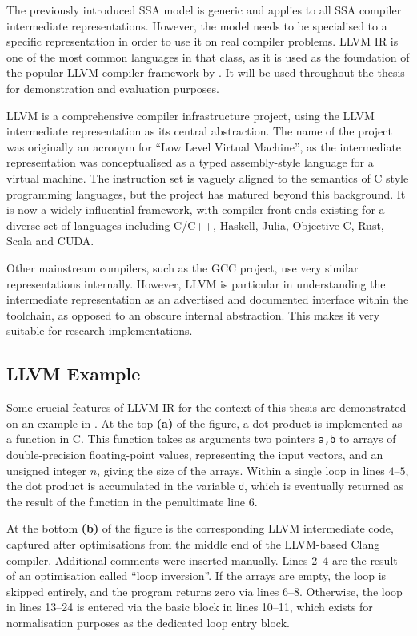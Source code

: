     The previously introduced SSA model is generic and applies to all SSA
    compiler intermediate representations.
    However, the model needs to be specialised to a specific representation in
    order to use it on real compiler problems.
    LLVM IR is one of the most common languages in that class, as it is
    used as the foundation of the popular LLVM compiler framework by
    \citet{lattner2004llvm}.
    It will be used throughout the thesis for demonstration and evaluation
    purposes.

    LLVM is a comprehensive compiler infrastructure project, using the LLVM
    intermediate representation as its central abstraction.
    The name of the project was originally an acronym for
    ``Low Level Virtual Machine'', as the intermediate representation was
    conceptualised as a typed assembly-style language for a virtual machine.
    The instruction set is vaguely aligned to the semantics of C style
    programming languages, but the project has matured beyond this background.
    It is now a widely influential framework, with compiler front ends existing
    for a diverse set of languages including C/C++, Haskell, Julia, Objective-C,
    Rust, Scala and CUDA.

    Other mainstream compilers, such as the GCC project, use very similar
    representations internally.
    However, LLVM is particular in understanding the intermediate
    representation as an advertised and documented interface within the
    toolchain, as opposed to an obscure internal abstraction.
    This makes it very suitable for research implementations.

\subsection{LLVM Example}

    Some crucial features of LLVM IR for the context of this thesis are
    demonstrated on an example in .
    At the top {\bf (a)} of the figure, a dot product is implemented as a
    function in C.
    This function takes as arguments two pointers {\tt a,b} to arrays of
    double-precision floating-point values, representing the input vectors, and
    an unsigned integer $n$, giving the size of the arrays.
    Within a single loop in lines $4$--$5$, the dot product is accumulated in
    the variable {\tt d}, which is eventually returned as the result of the
    function in the penultimate line $6$.

    At the bottom {\bf (b)} of the figure is the corresponding LLVM intermediate
    code, captured after optimisations from the middle end of the LLVM-based
    Clang compiler.
    Additional comments were inserted manually.
    Lines 2--4 are the result of an optimisation called ``loop inversion''.
    If the arrays are empty, the loop is skipped entirely, and the program
    returns zero via lines 6--8.
    Otherwise, the loop in lines 13--24 is entered via the basic block in lines
    10--11, which exists for normalisation purposes as the dedicated loop entry
    block.

